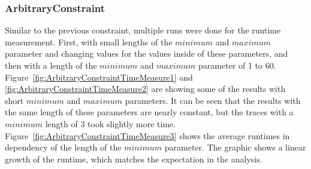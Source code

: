 \subsubsection{ArbitraryConstraint}
	Similar to the previous constraint, multiple runs were done for the runtime measurement. First, with small lengths of the $minimum$ and $maximum$ parameter and changing values for the values inside of these parameters, and then with a length of the $minimum$ and $maximum$ parameter of 1 to 60. Figure~\ref{fig:ArbitraryConstraintTimeMeasure1} and \ref{fig:ArbitraryConstraintTimeMeasure2} are showing some of the results with short $minimum$ and $maximum$ parameters. It can be seen that the results with the same length of these parameters are nearly constant, but the traces with a $minimum$ length of 3 took slightly more time. Figure~\ref{fig:ArbitraryConstraintTimeMeasure3} shows the average runtimes in dependency of the length of the $minimum$ parameter. The graphic shows a linear growth of the runtime, which matches the expectation in the analysis.
